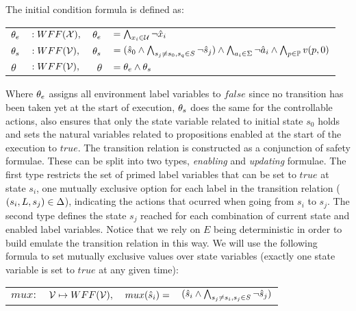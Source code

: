The initial condition formula is defined as:

\vspace{1em}
\footnotesize
	\begin{tabular}{l l r l}
		${\theta_e}$&$:WFF({\mathcal{X}}),$ &
		${\theta_e}$&$= \bigwedge_{x_i \in \mathcal{U}}\neg \hat{x}_i$\\
		${\theta_s}$&$:WFF({\mathcal{V}}),$ &
		${\theta_s}$&$= (\hat{s}_{0} \wedge\bigwedge_{s_j \neq s_0, s_q \in S}\neg \hat{s}_{j}) \wedge \bigwedge_{a_i \in \Sigma}\neg \hat{a}_i \wedge \bigwedge_{p \in \mathbb{P}}v(p,0)$\\
		$\theta$&$:WFF({\mathcal{V}}),$ &
		$\theta$&$= {\theta_e} \wedge {\theta_s}$\\		
	\end{tabular}
\normalsize
\vspace{1em}

Where ${\theta_e}$ assigns all environment label variables to $false$ since no transition has been taken yet at the start of execution, ${\theta_s}$ does the same for the controllable actions, also ensures that only the state variable related to initial state $s_0$ holds and sets the natural variables related to propositions enabled at the start of the execution to $true$.
The transition relation is constructed as a conjunction of safety formulae. These can be split into two types, \emph{enabling} and \emph{updating} formulae. The first type restricts the set of primed label variables that can be set to $true$ at state $s_i$, one mutually exclusive option for each label \actionLabel in the transition relation ($(s_i,L,s_j) \in \Delta$), indicating the actions that ocurred when going from $s_i$ to $s_j$. The second type defines the state $s_j$ reached for each combination of current state and enabled label variables. Notice that we rely on $E$ being deterministic in order to build emulate the transition relation in this way.
We will use the following formula to set mutually exclusive values over state variables (exactly one state variable is set to $true$ at any given time):

\begin{center}
	\begin{tabular}{r r r l}
$mux:$&${\mathcal{V}} \mapsto WFF({\mathcal{V}}),$&$mux(\hat{s}_{i}) = $&$(\hat{s}_{i} \wedge\bigwedge_{s_j \neq s_i, s_j \in S}\neg \hat{s}_{j})$
	\end{tabular}
\end{center}

